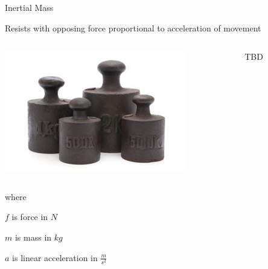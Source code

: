 \documentclass[compress]{beamer}
\begin{document}
\begin{frame}{Inertial Mass}

Resists with opposing force proportional to acceleration of movement

    \begin{columns}
        \begin{column}{0.5\linewidth}
            \begin{center}
                \includegraphics[height=0.3\paperheight]{image60}
            \end{center}
        \end{column}
        \begin{column}{0.5\linewidth}
            TBD
        \end{column}
    \end{columns}

where

$f$ is force in $N$

$m$ is mass in $kg$

$a$ is linear acceleration in $\frac{m}{s^2}$

\end{frame}
\end{document}
